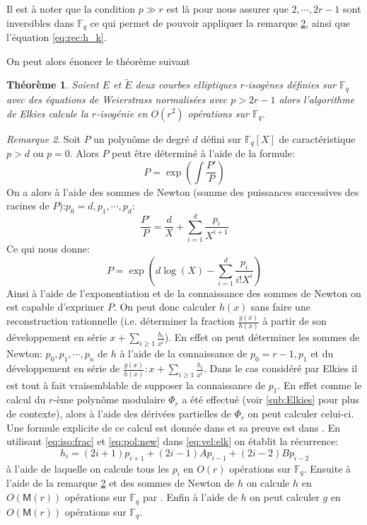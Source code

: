 \documentclass[10pt,a4paper]{book}
\theoremstyle{plain}
\newtheorem{thm}{Théorème}[chapter]
\theoremstyle{definition}
\theoremstyle{definition}
\theoremstyle{definition}
\theoremstyle{definition}
\theoremstyle{definition}
\theoremstyle{remark}
\newtheorem{rem}[thm]{Remarque}
\theoremstyle{remark}
\theoremstyle{definition}
\begin{document}
Il est à noter que la condition $p \gg r$ est là pour nous assurer que $2, \cdots, 2r-1$ sont inversibles dans $\mathbb{F}_q$ ce qui permet de pouvoir appliquer la remarque \ref{rem:pol:rec}, ainsi que l'équation \eqref{eq:rec:h_k}.

On peut alors énoncer le théorème suivant
\begin{thm}
Soient $E$ et $\tilde{E}$ deux courbes elliptiques $r$-isogènes définies sur
$\mathbb{F}_q$ avec des équations de Weierstrass normalisées avec $p>2r-1$ 
alors l'algorithme de Elkies calcule la $r$-isogénie en $O(r^2)$ opérations sur
$\mathbb{F}_q$.
\end{thm}


\begin{rem}
\label{rem:pol:rec}
Soit $P$ un polynôme de degré $d$ défini sur $\mathbb{F}_q[X]$ de caractéristique $p>d$ ou $p=0$. Alors $P$ peut être déterminé à l'aide de la formule:
\begin{equation}
P=\exp\left(\int{\frac{P'}{P}}\right)
\end{equation} 
On a alors à l'aide des sommes de Newton (somme des puissances successives des racines de $P$):$p_0=d,p_1, \cdots, p_d$:
\begin{equation}
\label{eq:pol:new}
\frac{P'}{P}= \frac{d}{X} + \sum_{i = 1}^d \frac{p_i}{X^{i+1}}
\end{equation}
Ce qui nous donne:
\begin{equation}
P=\exp\left( d \log(X) - \sum_{i = 1}^{d} \frac{p_i}{i!X^i} \right)
\end{equation} 
Ainsi à l'aide de l'exponentiation et de la connaissance des sommes de Newton 
on est capable d'exprimer $P$.
On peut donc calculer $h(x)$ sans faire une reconstruction rationnelle (i.e. déterminer 
la fraction $\frac{g(x)}{h(x)}$ à partir de son développement en série 
$x+\sum_{i \geqslant 1}\frac{h_i}{x^i}$). En effet on peut déterminer les sommes
de Newton: $p_0,p_1,\cdots, p_n$ de $h$ à l'aide de la connaissance de 
$p_0=r-1, p_1$ et du développement en série de $\frac{g(x)}{h(x)}:x+
\sum_{i \geqslant 1}\frac{h_i}{x^i}$.
Dans le cas considéré par Elkies il est tout à fait vraisemblable de supposer 
la connaissance de $p_1$. En effet comme le calcul du $r$-ème polynôme 
modulaire $\Phi_{r}$ a été effectué (voir \ref{sub:Elkies} pour plus de 
contexte), alors à l'aide des dérivées partielles de $\Phi_{r}$ on peut 
calculer celui-ci. Une formule explicite de ce calcul est donnée dans 
\cite[Theorem 17.22]{ehcc05} et sa preuve est dans \cite[§7]{Schoof95}. En 
utilisant \eqref{eq:iso:frac} et \eqref{eq:pol:new} dans \eqref{eq:vel:elk} on 
établit la récurrence:
\begin{equation}
\label{eq:p:rec}
h_i=(2i+1)p_{i+1}+(2i-1)Ap_{i-1}+(2i-2)Bp_{i-2}
\end{equation}
à l'aide de laquelle on calcule tous les $p_i$ en $O(r)$ opérations sur 
$\mathbb{F}_q$. Ensuite à l'aide de la remarque \ref{rem:pol:rec} et des sommes
de Newton de $h$ on calcule $h$ en $O(\mathsf{M}(r))$ opérations sur 
$\mathbb{F}_q$ par \cite[§2.2]{BMSS08}.
Enfin à l'aide de $h$ on peut calculer $g$ en $O(\mathsf{M}(r))$ opérations sur
$\mathbb{F}_q$.
\end{rem}
 
\end{document}
